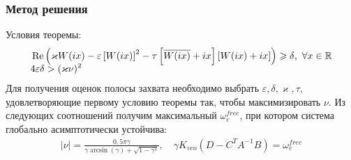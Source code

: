 \documentclass{beamer}
\begin{document}
\begin{frame}
\frametitle{Метод решения}
Условия теоремы:\vspace{-2mm}
 \begin{align*}
&\operatorname{Re}\left( \varkappa W(ix)- \varepsilon\left[W(ix)\right]^2-\tau\left[ \overline{W(ix)}+ix \right]\left[W(ix)+ix \right]\right) \geqslant \delta \text{,}\enskip\forall x \in \mathbb{R}\\[-2mm]
&4\varepsilon\delta > (\varkappa\nu)^2
\end{align*}
Для получения оценок полосы захвата необходимо выбрать $\varepsilon, \delta, \varkappa, \tau$, удовлетворяющие первому условию теоремы так, чтобы максимизировать $\nu$. 
Из следующих соотношений получим максимальный $\omega_e^{free}$, при котором система глобально асимптотически устойчива:
 \begin{equation}
 \begin{aligned}
\mid\nu\mid = \frac{0,5\pi\gamma}{\gamma \operatorname{arcsin} (\gamma) + \sqrt{1-\gamma^2}}, \quad \gamma K_{vco}\left(D-C^T A^{-1}B\right)  = \omega_e^{free}
 \end{aligned}
\end{equation}
\end{frame}

\end{document}

